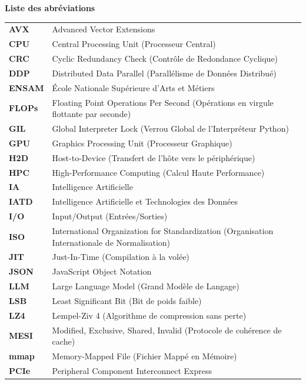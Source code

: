 \documentclass[12pt,a4paper]{report}
\begin{document}
\begin{center}
    \LARGE \textbf{Liste des abréviations}
\end{center}
\vspace{1cm}

\begin{tabular}{>{\bfseries}ll}
AVX    & Advanced Vector Extensions \\
CPU    & Central Processing Unit (Processeur Central) \\
CRC    & Cyclic Redundancy Check (Contrôle de Redondance Cyclique) \\
DDP    & Distributed Data Parallel (Parallélisme de Données Distribué) \\
ENSAM  & École Nationale Supérieure d’Arts et Métiers \\
FLOPs  & Floating Point Operations Per Second (Opérations en virgule flottante par seconde) \\
GIL    & Global Interpreter Lock (Verrou Global de l'Interpréteur Python) \\
GPU    & Graphics Processing Unit (Processeur Graphique) \\
H2D    & Host-to-Device (Transfert de l'hôte vers le périphérique) \\
HPC    & High-Performance Computing (Calcul Haute Performance) \\
IA     & Intelligence Artificielle \\
IATD   & Intelligence Artificielle et Technologies des Données \\
I/O    & Input/Output (Entrées/Sorties) \\
ISO    & International Organization for Standardization (Organisation Internationale de Normalisation) \\
JIT    & Just-In-Time (Compilation à la volée) \\
JSON   & JavaScript Object Notation \\
LLM    & Large Language Model (Grand Modèle de Langage) \\
LSB    & Least Significant Bit (Bit de poids faible) \\
LZ4    & Lempel-Ziv 4 (Algorithme de compression sans perte) \\
MESI   & Modified, Exclusive, Shared, Invalid (Protocole de cohérence de cache) \\
mmap   & Memory-Mapped File (Fichier Mappé en Mémoire) \\
PCIe   & Peripheral Component Interconnect Express \\

\end{tabular}
\end{document}
